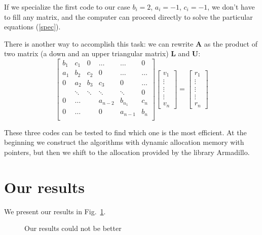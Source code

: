 \documentclass[10pt,showpacs,preprintnumbers,footinbib,amsmath,amssymb,aps,prl,twocolumn,groupedaddress,superscriptaddress,showkeys]{revtex4-1}
\begin{document}
If we specialize the first code to our case $b_i=2$, $a_i=-1$, $c_i=-1$, we don't have to fill any matrix, and the computer can proceed directly to solve the particular equations (\ref{spec}).

There is another way to accomplish this task: we can rewrite $\mathbf{A}$ as the product of two matrix (a down and an upper triangular matrix) $\mathbf{L}$ and $\mathbf{U}$:
\begin{equation}
\begin{bmatrix}
b_1& c_1& 0 &\dots   & \dots &0 \\
a_1 & b_2 & c_2 &0 &\dots &\dots \\
0&a_2 & b_3 & c_3 & 0 & \dots \\
& \ddots   & \ddots &\ddots   &\ddots & 0 \\
0&\dots   &  &a_{n-2} &b_{n_1}& c_n \\
0&\dots    &  & 0  &a_{n-1} & b_n \\
\end{bmatrix}\left[\begin{array}{c}
v_1 \\
\vdots \\
\vdots \\
\vdots \\
v_n
\end{array}\right]=\left[\begin{array}{c}
r_1 \\
\vdots \\
\vdots \\
\vdots \\
r_n
\end{array}\right]
\end{equation} 

These three codes can be tested to find which one is the most efficient. At the beginning we construct the algorithms with dynamic allocation memory with pointers, but then we shift to the allocation provided by the library Armadillo.  %

\section{Our results}

We present our results in Fig.~\ref{fig:figure1}.

\begin{figure} \label{fig:figure1}
\caption{Our results could not be better}
\end{figure}
\end{document}
